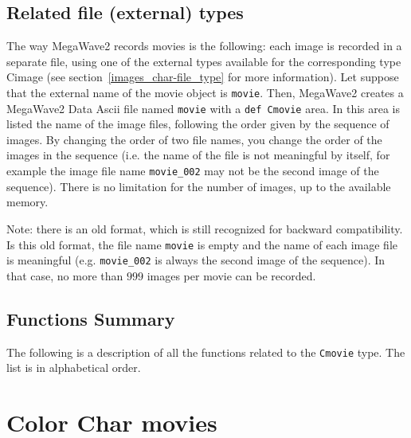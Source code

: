 \subsection{Related file (external) types}
\label{movies_char-file_type}

The way MegaWave2 records movies is the following:
each image is recorded in a separate file, using one of the external types available for the corresponding type Cimage (see section~\ref{images_char-file_type} for more information).
Let suppose that the external name of the movie object is \verb+movie+.
Then, MegaWave2 creates a MegaWave2 Data Ascii file named \verb+movie+ with a \verb+def Cmovie+ area.
In this area is listed the name of the image files, following the order given by the sequence of images.
By changing the order of two file names, you change the order of the images in the sequence (i.e. the name of
the file is not meaningful by itself, for example the image file name \verb+movie_002+ may not be the second
image of the sequence).
There is no limitation for the number of images, up to the available memory.

Note: there is an old format, which is still recognized for backward compatibility. 
Is this old format, the file name \verb+movie+ is empty and the name of each image file is meaningful
(e.g. \verb+movie_002+ is always the second image of the sequence).
In that case, no more than $999$ images per movie can be recorded.

\subsection{Functions Summary}
\label{movies_char-movies_function}

The following is a description of all the functions related to 
the \verb+Cmovie+ type. The list is in alphabetical order.

\newpage %



\section{Color Char movies}


\label{movies_color-char-movies}
\def\ccmovie{{\tt Ccmovie }}
\index{structure!\ccmovie}

